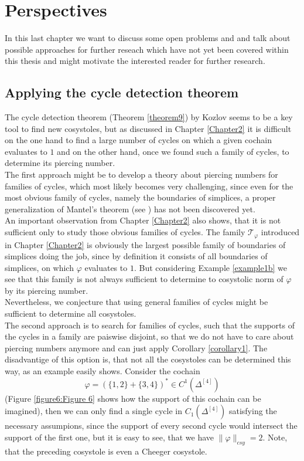
\chapter{Perspectives}

\label{Chapter5}

In this last chapter we want to discuss some open problems and and talk about possible approaches for further reseach which have not yet been covered within this thesis and might motivate the interested reader for further research.

\section{Applying the cycle detection theorem}

The cycle detection theorem (Theorem \ref{theorem9}) by Kozlov seems to be a key tool to find new cosystoles, but as discussed in Chapter \ref{Chapter2} it is difficult on the one hand to find a large number of cycles on which a given cochain evaluates to \(1\) and on the other hand, once we found such a family of cycles, to determine its piercing number.\\
The first approach might be to develop a theory about piercing numbers for families of cycles, which most likely becomes very challenging, since even for the most obvious family of cycles, namely the boundaries of simplices, a proper generalization of Mantel's theorem (see \cite{7}) has not been discovered yet.\\
An important observation from Chapter \ref{Chapter2} also shows, that it is not sufficient only to study those obvious families of cycles. The family \(\mathcal{T}_{\varphi}\) introduced in Chapter \ref{Chapter2} is obviously the largest possible family of boundaries of simplices doing the job, since by definition it consists of all boundaries of simplices, on which \(\varphi\) evaluates to \(1\). But considering Example \ref{example1b} we see that this family is not always sufficient to determine to cosystolic norm of \(\varphi\) by its piercing number.\\
Nevertheless, we conjecture that using general families of cycles might be sufficient to determine all cosystoles.\\
The second approach is to search for families of cycles, such that the supports of the cycles in a family are paiswise disjoint, so that we do not have to care about piercing numbers anymore and can just apply Corollary \ref{corollary1}. The disadvantige of this option is, that not all the cosystoles can be determined this way, as an example easily shows. Consider the cochain
\[
\varphi=\left(\{1,2\}+\{3,4\}\right)^*\in C^1(\Delta^{[4]})
\]
(Figure \ref{figure6:Figure 6} shows how the support of this cochain can be imagined), then we can only find a single cycle in \(C_1(\Delta^{[4]})\) satisfying the necessary assumpions, since the support of every second cycle would intersect the support of the first one, but it is easy to see, that we have \(\|\varphi\|_{csy}=2\). Note, that the preceding cosystole is even a Cheeger cosystole.

